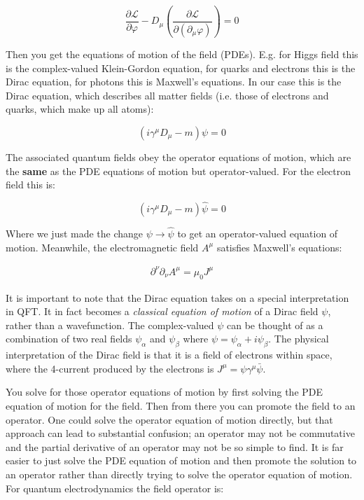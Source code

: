 \begin{equation}
\frac{\partial \mathscr{L}}{\partial \varphi} - D_\mu \left(\frac{\partial \mathscr{L}}{\partial (\partial_\mu \varphi)}\right) = 0
\end{equation}

Then you get the equations of motion of the field (PDEs). E.g. for Higgs field this is the complex-valued Klein-Gordon equation, for quarks and electrons this is the Dirac equation, for photons this is Maxwell's equations. In our case this is the Dirac equation, which describes all matter fields (i.e. those of electrons and quarks, which make up all atoms):

\begin{equation}
(i \gamma^\mu D_\mu - m) \psi = 0
\end{equation}

The associated quantum fields obey the operator equations of motion, which are the \textbf{same} as the PDE equations of motion but operator-valued. For the electron field this is:

\begin{equation}
(i \gamma^\mu D_\mu - m) \hat \psi = 0
\end{equation}

Where we just made the change $\psi \to \hat \psi$ to get an operator-valued equation of motion. Meanwhile, the electromagnetic field $A^\mu$ satisfies Maxwell's equations:

\begin{align*}
\partial^\nu \partial_\nu A^\mu = \mu_0 J^\mu
\end{align*}

It is important to note that the Dirac equation takes on a special interpretation in QFT. It in fact becomes a \emph{classical equation of motion} of a Dirac field $\psi$, rather than a wavefunction. The complex-valued $\psi$ can be thought of as a combination of two real fields $\psi_\alpha$ and $\psi_\beta$ where $\psi = \psi_\alpha + i \psi_\beta$. The physical interpretation of the Dirac field is that it is a field of electrons within space, where the 4-current produced by the electrons is $J^\mu = \psi \gamma^\mu \bar \psi$.

You solve for those operator equations of motion by first solving the PDE equation of motion for the field. Then from there you can promote the field to an operator. One could solve the operator equation of motion directly, but that approach can lead to substantial confusion; an operator may not be commutative and the partial derivative of an operator may not be so simple to find. It is far easier to just solve the PDE equation of motion and then promote the solution to an operator rather than directly trying to solve the operator equation of motion. For quantum electrodynamics the field operator is:

